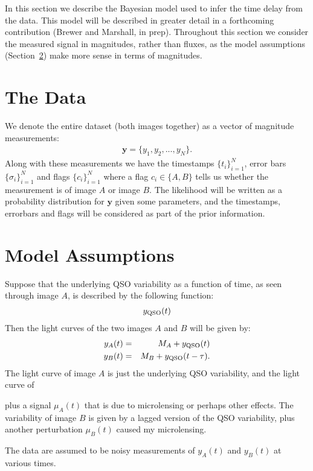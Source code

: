 \documentclass[a4paper, 10pt]{article}
\title{}
\author{}
\date{} %
\newcommand{\yy}{\mathbf{y}}
\begin{document}
In this section we describe the Bayesian model used to infer the
time delay from the data. This model will be described in greater detail in
a forthcoming contribution (Brewer and Marshall, in prep).
Throughout this section we consider the measured signal in magnitudes,
rather than fluxes, as the model assumptions (Section~\ref{sec:assumptions})
make more sense in terms of magnitudes.

\section{The Data}
We denote the entire dataset (both images together)
as a vector of magnitude measurements:
\begin{eqnarray}
\yy = \{y_1, y_2, ..., y_N\}.
\end{eqnarray}
Along with these measurements we have the timestamps $\{t_i\}_{i=1}^N$,
error bars $\{\sigma_i\}_{i=1}^N$ and flags
$\{c_i\}_{i=1}^N$ where a flag $c_i \in \{A, B\}$ tells us whether the
measurement is of image $A$ or image $B$. The likelihood will be
written as a probability distribution for $\yy$ given some parameters, and the
timestamps, errorbars and flags will be considered as part of the prior
information.

\section{Model Assumptions}\label{sec:assumptions}
Suppose that the underlying QSO variability as a function
of time, as seen through image $A$, is described by the following function:
\begin{eqnarray}
y_{\rm QSO}(t)
\end{eqnarray}
Then the light curves of the two images
$A$ and $B$ will be given by:
\begin{eqnarray}
y_A(t) &=& M_A + y_{\rm QSO}(t)\\
y_B(t) &=& M_B + y_{\rm QSO}(t - \tau).
\end{eqnarray}
The light curve of image $A$ is just the underlying QSO variability,
and the light curve of 




plus a signal $\mu_A(t)$ that is due to microlensing or perhaps
other effects. The variability of image $B$ is given by
a lagged version of the QSO variability, plus another
perturbation $\mu_B(t)$ caused my microlensing.

The data are assumed to be noisy measurements of $y_A(t)$ and
$y_B(t)$ at various times. 
\end{document}
